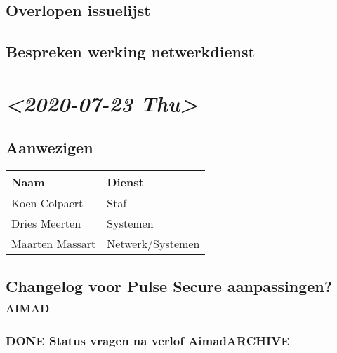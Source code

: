 \documentclass[11pt]{article}
\begin{document}
\subsection{Overlopen issuelijst}
\label{sec:org77d922c}
\subsection{Bespreken werking netwerkdienst}
\label{sec:org8c7e404}


\section{\textit{<2020-07-23 Thu>}}
\label{sec:org21b4f24}
\subsection{Aanwezigen}
\label{sec:orgb28e638}
\begin{center}
\begin{tabular}{ll}
Naam & Dienst\\
\hline
Koen Colpaert & Staf\\
Dries Meerten & Systemen\\
Maarten Massart & Netwerk/Systemen\\
\end{tabular}
\end{center}

\subsection{Changelog voor Pulse Secure aanpassingen?\hfill{}\textsc{aimad}}
\label{sec:orgb0a9bfa}
\subsubsection{{\bfseries\sffamily DONE} Status vragen na verlof Aimad\hfill{}\textsc{ARCHIVE}}
\label{sec:org7a9ce80}
\end{document}
